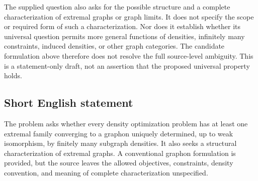 \documentclass[11pt]{article}
\begin{document}
The supplied question also asks for the possible structure and a complete characterization of extremal graphs or graph limits. It does not specify the scope or required form of such a characterization. Nor does it establish whether its universal question permits more general functions of densities, infinitely many constraints, induced densities, or other graph categories. The candidate formulation above therefore does not resolve the full source-level ambiguity. This is a statement-only draft, not an assertion that the proposed universal property holds.
\subsection{Short English statement}
The problem asks whether every density optimization problem has at least one extremal family converging to a graphon uniquely determined, up to weak isomorphism, by finitely many subgraph densities. It also seeks a structural characterization of extremal graphs. A conventional graphon formulation is provided, but the source leaves the allowed objectives, constraints, density convention, and meaning of complete characterization unspecified.
\end{document}
